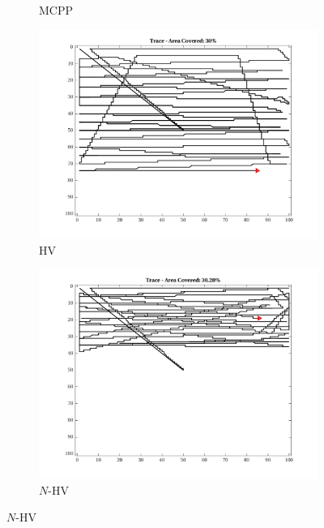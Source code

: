 \begin{figure}[htb!]
\begin{subfigure}[t]{0.25\textwidth}
        \captionsetup{skip=0.20\baselineskip,size=footnotesize}
        \caption{MCPP}
    \end{subfigure}%
    \begin{subfigure}[t]{0.25\textwidth}
        \centering
        \includegraphics[width=\linewidth]{figures/path_nhv_30p_100x100_sf_1_seed_2.png}
        \captionsetup{skip=0.20\baselineskip,size=footnotesize}
        \caption{HV}
    \end{subfigure}%
    \begin{subfigure}[t]{0.25\textwidth}
        \centering
        \includegraphics[width=\linewidth]{figures/path_nnhv_30p_100x100_sf_1_seed_2.png}
        \captionsetup{skip=0.20\baselineskip,size=footnotesize}
        \caption{$N$-HV}

\end{subfigure}
\end{figure}
